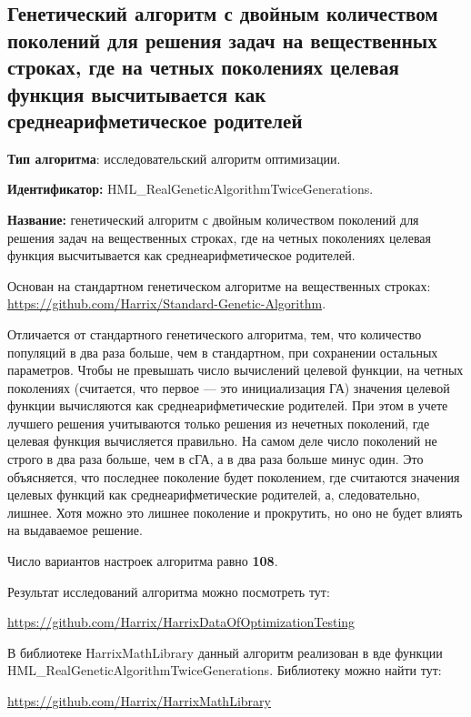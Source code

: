 \subsection{Генетический алгоритм с двойным количеством поколений для решения задач на вещественных строках, где на четных поколениях целевая функция высчитывается как среднеарифметическое родителей}\label{HarrixOptimizationAlgorithms:HML_RealGeneticAlgorithmTwiceGenerations}

\textbf{Тип алгоритма}: исследовательский алгоритм оптимизации.

\textbf{Идентификатор:} HML\_RealGeneticAlgorithmTwiceGenerations.

\textbf{Название:} генетический алгоритм с двойным количеством поколений для решения задач на вещественных строках, где на четных поколениях целевая функция высчитывается как среднеарифметическое родителей.

Основан на стандартном генетическом алгоритме на вещественных строках:  \href{https://github.com/Harrix/Standard-Genetic-Algorithm}{https://github.com/Harrix/Standard-Genetic-Algorithm}. 

Отличается от стандартного генетического алгоритма, тем, что количество популяций в два раза больше, чем в стандартном, при сохранении остальных параметров. Чтобы не превышать число вычислений целевой функции, на четных поколениях (считается, что первое --- это инициализация ГА) значения целевой функции вычисляются как среднеарифметические родителей. При этом в учете лучшего решения учитываются только решения из нечетных поколений, где целевая функция вычисляется правильно. На самом деле число поколений не строго в два раза больше, чем в сГА, а в два раза больше минус один. Это объясняется, что последнее поколение будет поколением, где считаются значения целевых функций как среднеарифметические родителей, а, следовательно, лишнее. Хотя можно это лишнее поколение и прокрутить, но оно не будет влиять на выдаваемое решение.

Число вариантов настроек алгоритма равно \textbf{108}.

Результат исследований алгоритма можно посмотреть тут:

\href{https://github.com/Harrix/HarrixDataOfOptimizationTesting}{https://github.com/Harrix/HarrixDataOfOptimizationTesting}

В библиотеке HarrixMathLibrary данный алгоритм реализован в вде функции HML\_RealGeneticAlgorithmTwiceGenerations. Библиотеку можно найти тут:

\href{https://github.com/Harrix/HarrixMathLibrary}{https://github.com/Harrix/HarrixMathLibrary}
